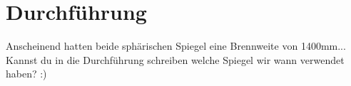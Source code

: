 \section{Durchführung}
\label{sec:Durchführung}

Anscheinend hatten beide sphärischen Spiegel eine Brennweite von 1400mm... Kannst du in die Durchführung schreiben welche Spiegel wir wann verwendet haben? :)
